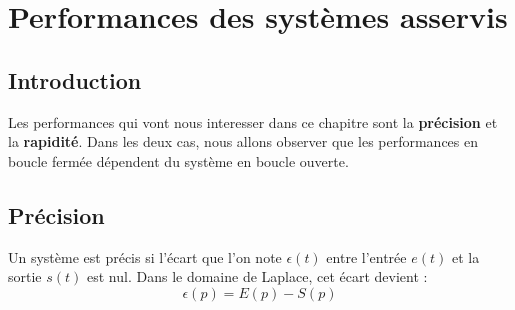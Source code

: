 \chapter{Performances des systèmes asservis\label{chap-perf}}

\minitoc
\newpage

\section{Introduction}
Les performances qui vont nous interesser dans 
ce chapitre sont la \textbf{précision} et la \textbf{rapidité}.
Dans les deux cas, nous allons observer que les performances
en boucle fermée dépendent du système en boucle ouverte. 

\section{Précision}
Un système est précis si l'écart que l'on note $\epsilon(t)$ 
entre l'entrée $e(t)$ et la sortie $s(t)$ est nul.
Dans le domaine de Laplace, cet écart devient :
$$
\epsilon(p)=E(p)-S(p)
$$

